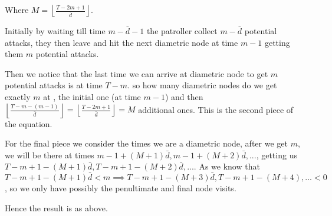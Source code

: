 \documentclass[a4paper,10pt]{article}
\newcommand{\floor}[1]{\left \lfloor #1 \right \rfloor}
\theoremstyle{definition}
\theoremstyle{definition}
\theoremstyle{remark}
\theoremstyle{definition}
\begin{document}
Where $M=\floor{\frac{T-2m+1}{\bar{d}}}$.

Initially by waiting till time $m-\bar{d}-1$ the patroller collect $m-\bar{d}$ potential attacks, they then leave and hit the next diametric node at time $m-1$ getting them $m$ potential attacks.

Then we notice that the last time we can arrive at diametric node to get $m$ potential attacks is at time $T-m$. so how many diametric nodes do we get exactly $m$ at , the initial one (at time $m-1$) and then $\floor{\frac{T-m-(m-1)}{\bar{d}}} = \floor{\frac{T-2m+1}{\bar{d}}}=M$ additional ones. This is the second piece of the equation.

For the final piece we consider the times we are a diametric node, after we get $m$, we will be there at times $m-1+(M+1)\bar{d} , m-1+(M+2)\bar{d}, ...$, getting us $T-m+1-(M+1)\bar{d},T-m+1-(M+2)\bar{d},...$. As we know that $T-m+1-(M+1)\bar{d} < m \implies T-m+1-(M+3)\bar{d},T-m+1-(M+4),...<0$, so we only have possibly the penultimate and final node visits.

Hence the result is as above.
\end{document}
